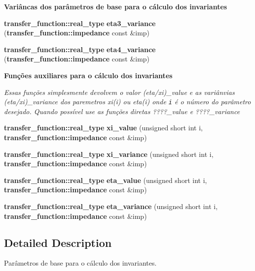 \begin{Indent}{\bf Variâncas dos parâmetros de base para o cálculo dos invariantes}
\begin{CompactItemize}
\item 
{\bf transfer\_\-function::real\_\-type} \textbf{eta3\_\-variance} ({\bf transfer\_\-function::impedance} const \&imp)\label{namespaceerro__manual_1_1base__xi__eta_1_1invariant__parameter_3d029ed00aa16880ec5873c309048023}

\item 
{\bf transfer\_\-function::real\_\-type} \textbf{eta4\_\-variance} ({\bf transfer\_\-function::impedance} const \&imp)\label{namespaceerro__manual_1_1base__xi__eta_1_1invariant__parameter_6e82d1accea01dad57f0e2f2d5e46801}

\end{CompactItemize}
\end{Indent}
\begin{Indent}{\bf Funções auxiliares para o cálculo dos invariantes}\par
{\em Essas funções simplesmente devolvem o valor (eta/xi)\_\-value e as variânvias (eta/xi)\_\-variance dos paremetros {\em xi(i)\/} ou {\em eta(i)\/} onde {\tt i} é o número do parâmetro desejado. Quando possível use as funções diretas ????\_\-value e ????\_\-variance }\begin{CompactItemize}
\item 
{\bf transfer\_\-function::real\_\-type} \textbf{xi\_\-value} (unsigned short int i, {\bf transfer\_\-function::impedance} const \&imp)\label{namespaceerro__manual_1_1base__xi__eta_1_1invariant__parameter_85a696094a43b9dd6ce30afd21fa429d}

\item 
{\bf transfer\_\-function::real\_\-type} \textbf{xi\_\-variance} (unsigned short int i, {\bf transfer\_\-function::impedance} const \&imp)\label{namespaceerro__manual_1_1base__xi__eta_1_1invariant__parameter_21f5427bcb12619ac62f92f690f4f0fa}

\item 
{\bf transfer\_\-function::real\_\-type} \textbf{eta\_\-value} (unsigned short int i, {\bf transfer\_\-function::impedance} const \&imp)\label{namespaceerro__manual_1_1base__xi__eta_1_1invariant__parameter_0ce7e287ff82ec42e8d239c9dd2d1fe6}

\item 
{\bf transfer\_\-function::real\_\-type} \textbf{eta\_\-variance} (unsigned short int i, {\bf transfer\_\-function::impedance} const \&imp)\label{namespaceerro__manual_1_1base__xi__eta_1_1invariant__parameter_651ff59e88f3d6f59cd094aba8c00040}

\end{CompactItemize}
\end{Indent}


\subsection{Detailed Description}
Parâmetros de base para o cálculo dos invariantes. 
